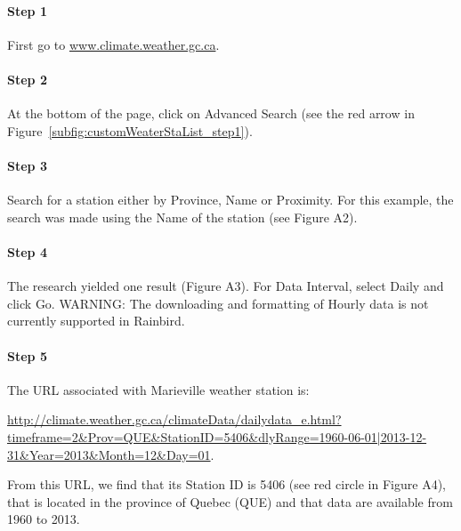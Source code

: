 \documentclass[12pt, letterpaper, fleqn]{report}
\begin{document}
\paragraph{Step 1} First go to \url{www.climate.weather.gc.ca}.

\paragraph{Step 2} At the bottom of the page, click on Advanced Search (see the red arrow in Figure~\ref{subfig:customWeaterStaList_step1}).

\paragraph{Step 3} Search for a station either by Province, Name or Proximity. For this example, the search was made using the Name of the station (see Figure A2).

\paragraph{Step 4} The research yielded one result (Figure A3). For Data Interval, select Daily and click Go.
	WARNING: The downloading and formatting of Hourly data is not currently supported in Rainbird.

\paragraph{Step 5} The URL associated with Marieville weather station is:\vspace{0.5cm}

\begin{sloppypar}
\noindent
\url{http://climate.weather.gc.ca/climateData/dailydata_e.html?timeframe=2&Prov=QUE&StationID=5406&dlyRange=1960-06-01|2013-12-31&Year=2013&Month=12&Day=01}.
\end{sloppypar}\vspace{0.5cm}

From this URL, we find that its Station ID is 5406 (see red circle in Figure A4), that is located in the province of Quebec (QUE) and that data are available from 1960 to 2013.
\end{document}
